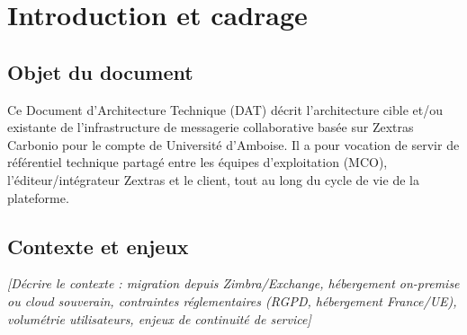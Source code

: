 \documentclass[11pt,a4paper]{report}
\newcommand{\placeholder}[1]{\textit{\textcolor{placeholdercol}{[#1]}}\par\vspace{4pt}}
\begin{document}
\clearpage
\tableofcontents
\clearpage

\renewcommand{\footrulewidth}{0.4pt}

\chapter{Introduction et cadrage}

\section{Objet du document}
Ce Document d'Architecture Technique (DAT) décrit l'architecture cible et/ou existante de l'infrastructure de messagerie collaborative basée sur Zextras Carbonio pour le compte de Université d'Amboise. Il a pour vocation de servir de référentiel technique partagé entre les équipes d'exploitation (MCO), l'éditeur/intégrateur Zextras et le client, tout au long du cycle de vie de la plateforme.

\section{Contexte et enjeux}
\placeholder{Décrire le contexte : migration depuis Zimbra/Exchange, hébergement on-premise ou cloud souverain, contraintes réglementaires (RGPD, hébergement France/UE), volumétrie utilisateurs, enjeux de continuité de service}
\end{document}
